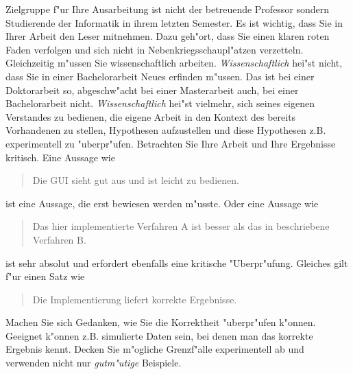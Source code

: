 \documentclass[12pt,a4paper,headinclude,twoside, plainheadsepline, open=right,numbers=noenddot]{scrreprt}
\begin{document}
Zielgruppe f"ur Ihre Ausarbeitung ist nicht der betreuende Professor sondern Studierende der Informatik in ihrem letzten Semester.
Es ist wichtig, dass Sie in Ihrer Arbeit den Leser mitnehmen.
Dazu geh"ort, dass Sie einen klaren roten Faden verfolgen und sich nicht in Nebenkriegsschaupl"atzen verzetteln.
Gleichzeitig m"ussen Sie wissenschaftlich arbeiten.
\emph{Wissenschaftlich} hei"st nicht, dass Sie in einer Bachelorarbeit Neues erfinden m"ussen.
Das ist bei einer Doktorarbeit so, abgeschw"acht bei einer Masterarbeit auch, bei einer Bachelorarbeit nicht.
\emph{Wissenschaftlich} hei"st vielmehr, sich seines eigenen Verstandes zu bedienen, die eigene Arbeit in den Kontext des bereits Vorhandenen zu stellen, Hypothesen aufzustellen und diese Hypothesen z.B. experimentell zu "uberpr"ufen.
Betrachten Sie Ihre Arbeit und Ihre Ergebnisse kritisch. Eine Aussage wie
\begin{quote}
\glqq Die GUI sieht gut aus und ist leicht zu bedienen\grqq.
\end{quote}
ist eine Aussage, die erst bewiesen werden m"usste. Oder eine Aussage wie
\begin{quote}
\glqq Das hier implementierte Verfahren A ist besser als das in \cite{palm2004color} beschriebene Verfahren B\grqq.
\end{quote}
ist sehr absolut und erfordert ebenfalls eine kritische "Uberpr"ufung. Gleiches gilt f"ur einen Satz wie
\begin{quote}
\glqq Die Implementierung liefert korrekte Ergebnisse\grqq.
\end{quote}
Machen Sie sich Gedanken, wie Sie die Korrektheit "uberpr"ufen k"onnen.
Geeignet k"onnen z.B. simulierte Daten sein, bei denen man das korrekte Ergebnis kennt.
Decken Sie m"ogliche Grenzf"alle experimentell ab und verwenden nicht nur \emph{gutm"utige} Beispiele.
\end{document}
